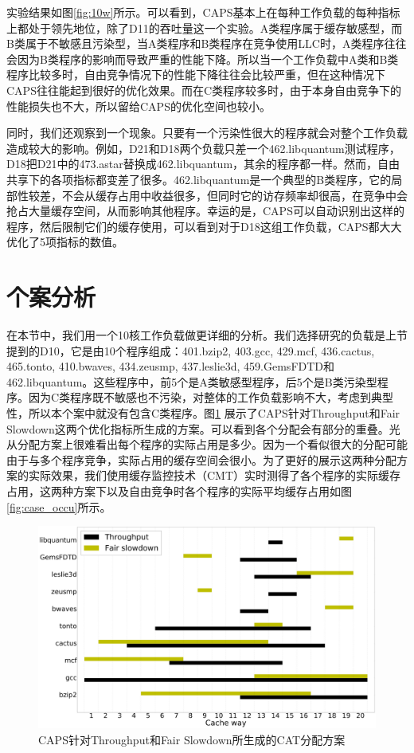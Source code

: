 实验结果如图\ref{fig:10w}所示。可以看到，CAPS基本上在每种工作负载的每种指标上都处于领先地位，除了D11的吞吐量这一个实验。A类程序属于缓存敏感型，而B类属于不敏感且污染型，当A类程序和B类程序在竞争使用LLC时，A类程序往往会因为B类程序的影响而导致严重的性能下降。所以当一个工作负载中A类和B类程序比较多时，自由竞争情况下的性能下降往往会比较严重，但在这种情况下CAPS往往能起到很好的优化效果。而在C类程序较多时，由于本身自由竞争下的性能损失也不大，所以留给CAPS的优化空间也较小。

同时，我们还观察到一个现象。只要有一个污染性很大的程序就会对整个工作负载造成较大的影响。例如，D21和D18两个负载只差一个462.libquantum测试程序，D18把D21中的473.astar替换成462.libquantum，其余的程序都一样。然而，自由共享下的各项指标都变差了很多。462.libquantum是一个典型的B类程序，它的局部性较差，不会从缓存占用中收益很多，但同时它的访存频率却很高，在竞争中会抢占大量缓存空间，从而影响其他程序。幸运的是，CAPS可以自动识别出这样的程序，然后限制它们的缓存使用，可以看到对于D18这组工作负载，CAPS都大大优化了5项指标的数值。

\section{个案分析}

在本节中，我们用一个10核工作负载做更详细的分析。我们选择研究的负载是上节提到的D10，它是由10个程序组成：401.bzip2, 403.gcc, 429.mcf, 436.cactus, 465.tonto, 410.bwaves, 434.zeusmp, 437.leslie3d, 459.GemsFDTD和462.libquantum。这些程序中，前5个是A类敏感型程序，后5个是B类污染型程序。因为C类程序既不敏感也不污染，对整体的工作负载影响不大，考虑到典型性，所以本个案中就没有包含C类程序。图\ref{fig:case_scheme} 展示了CAPS针对Throughput和Fair Slowdown这两个优化指标所生成的方案。可以看到各个分配会有部分的重叠。光从分配方案上很难看出每个程序的实际占用是多少。因为一个看似很大的分配可能由于与多个程序竞争，实际占用的缓存空间会很小。为了更好的展示这两种分配方案的实际效果，我们使用缓存监控技术（CMT）实时测得了各个程序的实际缓存占用，这两种方案下以及自由竞争时各个程序的实际平均缓存占用如图\ref{fig:case_occu}所示。

\begin{figure}[htbp]
\centering
\includegraphics[width=0.95\columnwidth]{figures/case_study.pdf}
\caption{CAPS针对Throughput和Fair Slowdown所生成的CAT分配方案}
\label{fig:case_scheme}
\end{figure} 

